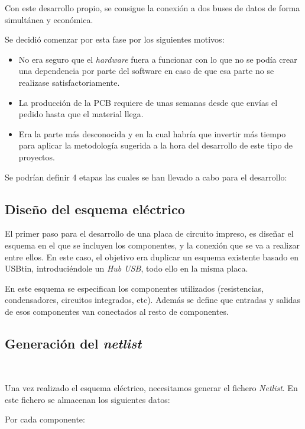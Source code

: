 Con este desarrollo propio, se consigue la conexión a dos buses de datos de forma simultánea y económica.

Se decidió comenzar por esta fase por los siguientes motivos:

\begin{itemize}
\item
No era seguro que el \emph{hardware} fuera a funcionar con lo que no se podía crear una dependencia por parte del software en caso de que esa parte no se realizase satisfactoriamente.

\item
La producción de la PCB requiere de unas semanas desde que envías el pedido hasta que el material llega.
\item
Era la parte más desconocida y en la cual habría que invertir más tiempo para aplicar la metodología sugerida a la hora del desarrollo de este tipo de proyectos.
\end{itemize}

Se podrían definir 4 etapas las cuales se han llevado a cabo para el desarrollo:

\subsection{Diseño del esquema eléctrico}\label{diseño_del_esquema_electrico}

El primer paso para el desarrollo de una placa de circuito impreso, es diseñar el esquema en el que se incluyen los componentes, y la conexión que se va a realizar entre ellos. En este caso, el objetivo era duplicar un esquema existente basado en USBtin\cite{usbtin}, introduciéndole un \emph{Hub USB}\cite{hubusb}, todo ello en la misma placa.


En este esquema se especifican los componentes utilizados (resistencias, condensadores, circuitos integrados, etc). Además se define que entradas y salidas de esos componentes van conectados al resto de componentes.


\subsection{Generación del \emph{netlist}}\

Una vez realizado el esquema eléctrico, necesitamos generar el fichero \emph{Netlist}. En este fichero se almacenan los siguientes datos:

Por cada componente:

